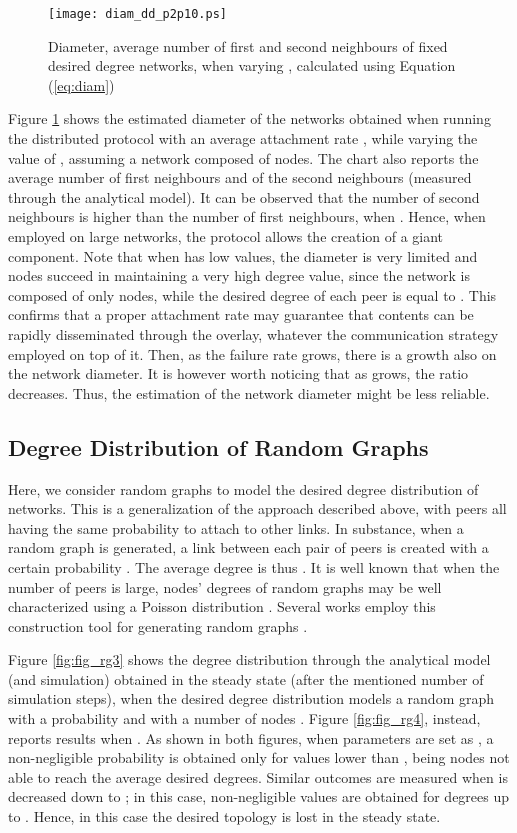 \documentclass[a4paper,twosided]{article}
\begin{document}
\begin{figure}
   \centering
   \texttt{[image: diam\_dd\_p2p10.ps]}
   \caption{Diameter, average number of first and second neighbours of fixed desired degree networks, when varying , calculated using Equation (\ref{eq:diam})}
   \label{fig:diam_dd}
\end{figure}

Figure \ref{fig:diam_dd} shows the estimated diameter of the networks obtained when running the distributed protocol with an average attachment rate , while varying the value of , assuming a network composed of  nodes. The chart also reports the average number of first neighbours  and of the second neighbours  (measured through the analytical model). It can be observed that the number of second neighbours is higher than the number of first neighbours, when . Hence, when employed on large networks, the protocol allows the creation of a giant component. Note that when  has low values, the diameter is very limited and nodes succeed in maintaining a very high degree value, since the network is composed of only  nodes, while the desired degree of each peer is equal to . This confirms that a proper attachment rate may guarantee that contents can be rapidly disseminated through the overlay, whatever the communication strategy employed on top of it. Then, as the failure rate grows, there is a growth also on the network diameter. It is however worth noticing that as  grows, the ratio  decreases. Thus, the estimation of the network diameter might be less reliable.



\subsection{Degree Distribution of Random Graphs}

Here, we consider random graphs to model the desired degree distribution of networks. This is a generalization of the approach described above, with peers all having the same probability to attach to other links. 
In substance, when a random graph is generated, a link between each pair of peers is created with a certain probability . The average degree is thus . It is well known that when the number of peers  is large, nodes' degrees of random graphs may be well characterized using a Poisson distribution .
Several works employ this construction tool for generating random graphs \cite{newmanHandbook}.

Figure \ref{fig:fig_rg3} shows the degree distribution through the analytical model (and simulation) obtained in the steady state (after the mentioned number of simulation steps), when the desired degree distribution 
models a random graph with a probability  and with a number of nodes . Figure \ref{fig:fig_rg4}, instead, reports results when . 
As shown in both figures, when parameters are set as , a non-negligible probability is obtained only for values lower than , being nodes not able to reach the average desired degrees. Similar outcomes are measured when  is decreased down to ; in this case, non-negligible values are obtained for degrees up to . Hence, in this case the desired topology is lost in the steady state.
\end{document}
